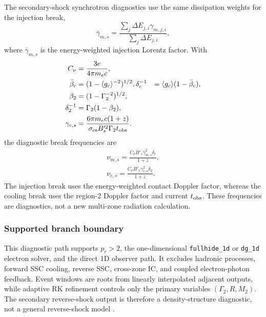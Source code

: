 \documentclass[twocolumn]{aastex702}
\begin{document}
The secondary-shock synchrotron diagnostics use the same dissipation weights for
the injection break,
\begin{equation}
\bar{\gamma}_{m,s}=
\frac{\sum_j \Delta E_{j,i}\gamma_{m,j,i}}
{\sum_j \Delta E_{j,i}},
\end{equation}
where \(\bar{\gamma}_{m,s}\) is the energy-weighted injection Lorentz factor.
With
\begin{equation}
\begin{aligned}
C_\nu&=\frac{3e}{4\pi m_ec},\\
\bar\beta_c&=(1-\langle g_c\rangle^{-2})^{1/2},
\delta_c^{-1}&=\langle g_c\rangle(1-\bar\beta_c),\\
\beta_2&=(1-\Gamma_2^{-2})^{1/2},\\
\delta_2^{-1}&=\Gamma_2(1-\beta_2),\\
\gamma_{c,s}&=
\frac{6\pi m_ec(1+z)}
{\sigma_{\rm es} B_s^{\prime 2}\Gamma_2 t_{\rm obs}}.
\end{aligned}
\end{equation}
the diagnostic break frequencies are
\begin{equation}
\begin{aligned}
\nu_{m,s}=
\frac{C_\nu B'_s\bar{\gamma}_{m,s}^2\delta_c}{1+z},\\
\nu_{c,s}=
\frac{C_\nu B'_s\gamma_{c,s}^2\delta_2}{1+z}.
\end{aligned}
\end{equation}
The injection break uses the energy-weighted contact Doppler factor, whereas
the cooling break uses the region-2 Doppler factor and current \(t_{\rm obs}\).
These frequencies are diagnostics, not a new multi-zone radiation calculation.

\subsubsection{Supported branch boundary}

This diagnostic path supports \(p_r>2\), the one-dimensional
\texttt{fullhide\_1d} or \texttt{dg\_1d} electron solver, and the direct 1D
observer path.  It excludes hadronic processes, forward SSC cooling, reverse
SSC, cross-zone IC, and coupled electron-photon feedback.  Event windows are
roots from linearly interpolated adjacent outputs, while adaptive RK refinement
controls only the primary variables \((\Gamma_2,R,M_2)\).  The secondary
reverse-shock output is therefore a density-structure diagnostic, not a general
reverse-shock model
\citep{DaiLu2002,NakarGranot2007,UhmZhang2014,Laskar2016GRB160509A,Alexander2017GRB160625B,Laskar2019GRB181201A,PangDai2024OffaxisRS}.
\end{document}
